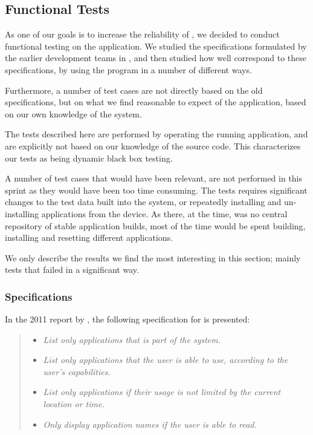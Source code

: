 \subsection{Functional Tests}\label{sec:testing_sprint1}

As one of our goals is to increase the reliability of \launcher, we decided to conduct functional testing on the application.
We studied the specifications formulated by the earlier development teams in \citet{launcher2011,launcher2012}, and then studied how well \launcher correspond to these specifications, by using the program in a number of different ways. 

Furthermore, a number of test cases are not directly based on the old specifications, but on what we find reasonable to expect of the application, based on our own knowledge of the system.

The tests described here are performed by operating the running application, and are explicitly not based on our knowledge of the source code. 
This characterizes our tests as being dynamic black box testing. 

A number of test cases that would have been relevant, are not performed in this sprint as they would have been too time consuming. 
The tests requires significant changes to the test data built into the \giraf system, or repeatedly installing and un-installing applications from the device.
As there, at the time, was no central repository of stable application builds, most of the time would be spent building, installing and resetting different applications.

We only describe the results we find the most interesting in this section; mainly tests that failed in a significant way. 

\subsubsection{Specifications}
In the 2011 report by \citet{launcher2011}, the following specification for \launcher is presented:

\begin{quote}
\begin{itemize}
	\item \textit{List only applications that is part of the \giraf system.}
	\item \textit{List only applications that the user is able to use, according to the user's capabilities.}
	\item \textit{List only applications if their usage is not limited by the current location or time.}
	\item \textit{Only display application names if the user is able to read.}
\end{itemize}
\end{quote}

